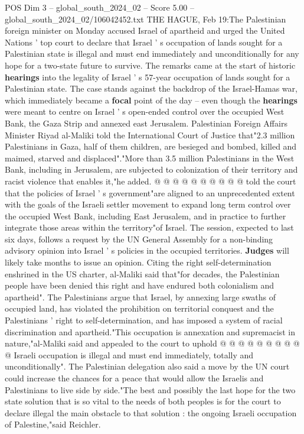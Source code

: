 \begin{textsample}{POS Dim 3 – global\_south\_2024\_02 – Score 5.00 – global\_south\_2024\_02/106042452.txt}  \label{ex:f3_pos_368}
THE HAGUE, Feb 19:The Palestinian foreign minister on Monday accused Israel of apartheid and urged the United Nations ' top court to declare that Israel ' s occupation of lands sought for a Palestinian state is illegal and must end immediately and unconditionally for any hope for a two-state future to survive.
The remarks came at the start of historic \textbf{hearings} into the legality of Israel ' s 57-year occupation of lands sought for a Palestinian state.
The case stands against the backdrop of the Israel-Hamas war, which immediately became a \textbf{focal} point of the day -- even though the \textbf{hearings} were meant to centre on Israel ' s open-ended control over the occupied West Bank, the Gaza Strip and annexed east Jerusalem.
Palestinian Foreign Affairs Minister Riyad al-Maliki told the International Court of Justice that"2.3 million Palestinians in Gaza, half of them children, are besieged and bombed, killed and maimed, starved and displaced"."More than 3.5 million Palestinians in the West Bank, including in Jerusalem, are subjected to colonization of their territory and racist violence that enables it,"he added. @ @ @ @ @ @ @ @ @ @ told the court that the policies of Israel ' s government"are aligned to an unprecedented extent with the goals of the Israeli settler movement to expand long term control over the occupied West Bank, including East Jerusalem, and in practice to further integrate those areas within the territory"of Israel.
The session, expected to last six days, follows a request by the UN General Assembly for a non-binding advisory opinion into Israel ' s policies in the occupied territories. \textbf{Judges} will likely take months to issue an opinion.
Citing the right self-determination enshrined in the US charter, al-Maliki said that"for decades, the Palestinian people have been denied this right and have endured both colonialism and apartheid".
The Palestinians argue that Israel, by annexing large swaths of occupied land, has violated the prohibition on territorial conquest and the Palestinians ' right to self-determination, and has imposed a system of racial discrimination and apartheid."This occupation is annexation and supremacist in nature,"al-Maliki said and appealed to the court to uphold @ @ @ @ @ @ @ @ @ @ Israeli occupation is illegal and must end immediately, totally and unconditionally".
The Palestinian delegation also said a move by the UN court could increase the chances for a peace that would allow the Israelis and Palestinians to live side by side."The best and possibly the last hope for the two state solution that is so vital to the needs of both peoples is for the court to declare illegal the main obstacle to that solution : the ongoing Israeli occupation of Palestine,"said Reichler.

\end{textsample}
